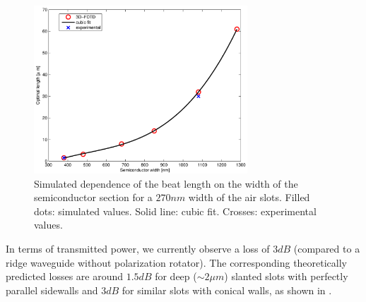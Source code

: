 \begin{figure}[htbp]
  \begin{center}
    \includegraphics[width=8cm]{pics/polrot_optimalL_P}
  \end{center}
  \caption{Simulated dependence of the beat length on the width of the
    semiconductor section for a $270 nm$ width of the air slots. Filled
    dots: simulated values. Solid line: cubic fit. Crosses: experimental
    values.}
  \label{fig:polrot_optimalL_P}
\end{figure}

In terms of transmitted power, we currently observe a loss of $3 dB$
(compared to a ridge waveguide without polarization rotator). The
corresponding theoretically predicted losses are around $1.5 dB$ for
deep ($\sim 2 \mu m$) slanted slots with perfectly parallel sidewalls
and $3 dB$ for similar slots with conical walls, as shown in
.

